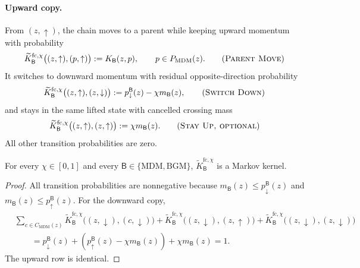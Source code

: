 \documentclass{article}
\numberwithin{theorem}{section}
\numberwithin{proposition}{section}
\numberwithin{corollary}{section}
\numberwithin{lemma}{section}
\numberwithin{conjecture}{section}
\numberwithin{remark}{section}
\numberwithin{definition}{section}
\numberwithin{assumption}{section}
\numberwithin{example}{section}
\newcommand{\sbra}[1]{\left(#1\right)}
\begin{document}
\begin{definition}
\paragraph{Upward copy.}
From $(z,\uparrow)$, the chain moves to a parent while keeping upward momentum with probability
\begin{equation*}
    \widetilde K_{\mathsf B}^{\mathrm{fc},\chi}\bigl((z,\uparrow),(p,\uparrow)\bigr):=K_{\mathsf B}(z,p),\qquad p\in P_{\mathrm{MDM}}(z).
    \tag{\textsc{Parent Move}}
\end{equation*}
It switches to downward momentum with residual opposite-direction probability
\begin{equation*}
    \widetilde K_{\mathsf B}^{\mathrm{fc},\chi}\bigl((z,\uparrow),(z,\downarrow)\bigr):=p_{\downarrow}^{\mathsf B}(z)-\chi m_{\mathsf B}(z),
    \tag{\textsc{Switch Down}}
\end{equation*}
and stays in the same lifted state with cancelled crossing mass
\begin{equation*}
    \widetilde K_{\mathsf B}^{\mathrm{fc},\chi}\bigl((z,\uparrow),(z,\uparrow)\bigr):=\chi m_{\mathsf B}(z).
    \tag{\textsc{Stay Up, optional}}
\end{equation*}
All other transition probabilities are zero.
\end{definition}

\begin{proposition}
\label{prop:generic_mdm_momentum_markov}
\label{prop:balanced_mdm_momentum_markov}
For every $\chi\in[0,1]$ and every $\mathsf B\in\{\mathrm{MDM},\mathrm{BGM}\}$, $\widetilde K_{\mathsf B}^{\mathrm{fc},\chi}$ is a Markov kernel.
\end{proposition}

\begin{proof}
All transition probabilities are nonnegative because $m_{\mathsf B}(z)\le p_{\downarrow}^{\mathsf B}(z)$ and $m_{\mathsf B}(z)\le p_{\uparrow}^{\mathsf B}(z)$. For the downward copy,
\begin{align*}
    &\sum_{c\in C_{\mathrm{MDM}}(z)}\widetilde K_{\mathsf B}^{\mathrm{fc},\chi}\bigl((z,\downarrow),(c,\downarrow)\bigr)
    +\widetilde K_{\mathsf B}^{\mathrm{fc},\chi}\bigl((z,\downarrow),(z,\uparrow)\bigr)
    +\widetilde K_{\mathsf B}^{\mathrm{fc},\chi}\bigl((z,\downarrow),(z,\downarrow)\bigr)\\
    &\qquad =p_{\downarrow}^{\mathsf B}(z)+\sbra{p_{\uparrow}^{\mathsf B}(z)-\chi m_{\mathsf B}(z)}+\chi m_{\mathsf B}(z)=1.
\end{align*}
The upward row is identical.
\end{proof}
\end{document}
